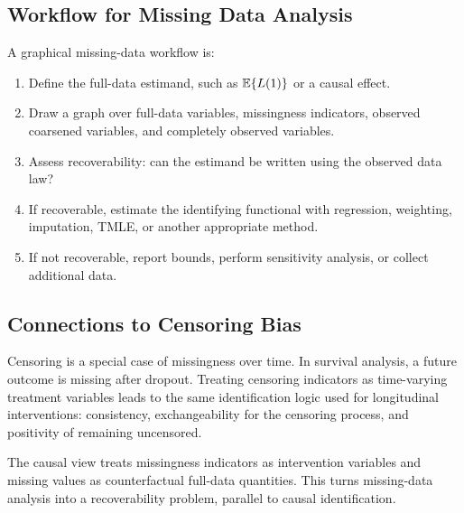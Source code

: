 \subsection{Workflow for Missing Data Analysis}

\begin{estimationbox}
A graphical missing-data workflow is:
\begin{enumerate}
  \item Define the full-data estimand, such as $\mathbb{E}\{L(1)\}$ or a causal effect.
  \item Draw a graph over full-data variables, missingness indicators, observed
  coarsened variables, and completely observed variables.
  \item Assess recoverability: can the estimand be written using the observed
  data law?
  \item If recoverable, estimate the identifying functional with regression,
  weighting, imputation, TMLE, or another appropriate method.
  \item If not recoverable, report bounds, perform sensitivity analysis, or
  collect additional data.
\end{enumerate}
\end{estimationbox}

\subsection{Connections to Censoring Bias}

Censoring is a special case of missingness over time. In survival analysis, a
future outcome is missing after dropout. Treating censoring indicators as
time-varying treatment variables leads to the same identification logic used for
longitudinal interventions: consistency, exchangeability for the censoring
process, and positivity of remaining uncensored.

\begin{keyidea}
The causal view treats missingness indicators as intervention variables and
missing values as counterfactual full-data quantities. This turns missing-data
analysis into a recoverability problem, parallel to causal identification.
\end{keyidea}
